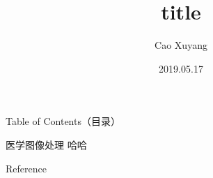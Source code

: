\documentclass{beamer}
\title{title}
\author{Cao Xuyang}
\date{2019.05.17}
\begin{document}
\frame{\titlepage}                  %
\begin{frame}{Table of Contents（目录）}    %
    \setcounter{tocdepth}{1}        %
    \tableofcontents                %
\end{frame}
\begin{frame}{医学图像处理}
    \alert{哈哈}
\end{frame}{}



\begin{frame}{Reference}
    
    
  
\end{frame}
\end{document}
